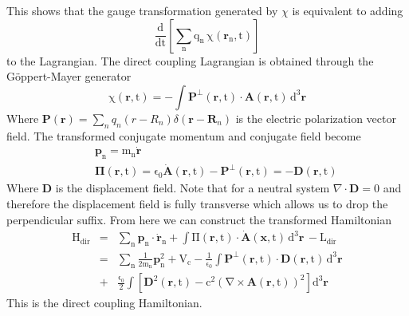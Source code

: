 \documentclass[twocolumn,english,pra,aps,superscriptaddress,floatfix]{revtex4-1}
\begin{document}
This shows that the gauge transformation generated by $\chi$ is equivalent to adding 
\begin{equation}
\mathrm{\frac{d}{dt}\left[\sum_n q_n\,\chi(\mathbf{r}_n,t)\right]}
\end{equation}
to the Lagrangian.  The direct coupling Lagrangian is obtained through the G\"{o}ppert-Mayer generator
\begin{equation}
\mathrm{\chi(\mathbf{r},t)=-\int \mathbf{P}^{\perp}(\mathbf{r},t)\cdot\mathbf{A}(\mathbf{r},t)\,d^3\mathbf{r}}
\end{equation}
Where $\mathbf{P}(\mathbf{r})=\sum_n q_n\left(r-R_n\right)\delta(\mathbf{r}-\mathbf{R}_n)$ is the electric polarization vector field.  The transformed conjugate momentum and conjugate field become
\begin{eqnarray}
&&\mathrm{\mathbf{p}_n=m_n\dot{\mathbf{r}}} \\
&&\mathrm{\mathbf{\Pi}(\mathbf{r},t)=\epsilon_0 \dot{\mathbf{A}}(\mathbf{r},t)-\mathbf{P}^{\perp}(\mathbf{r},t)=-\mathbf{D}(\mathbf{r},t)}
\end{eqnarray}
Where $\mathbf{D}$ is the displacement field.  Note that for a neutral system $\nabla\cdot\mathbf{D}=0$ and therefore the displacement field is fully transverse which allows us to drop the perpendicular suffix. From here we can construct the transformed Hamiltonian 
\begin{eqnarray}
\mathrm{H_{dir}}&=&\mathrm{\sum_n\mathbf{p}_n\cdot\dot{\mathbf{r}}_n+\int\Pi(\mathbf{r},t)\cdot\dot{\mathbf{A}}(\mathbf{x},t)\,d^3\mathbf{r}\,-L_{dir}} \nonumber \\
&=&\mathrm{\sum_n \frac{1}{2m_n}\mathbf{p}^2_n+V_{c}-\frac{1}{\epsilon_0}\int \mathbf{P}^{\perp}(\mathbf{r},t)\cdot\mathbf{D}(\mathbf{r},t)\,d^3\mathbf{r}}\nonumber \\
&+&\mathrm{\frac{\epsilon_0}{2}\int\left[\mathbf{D}^2(\mathbf{r},t)-c^2\left(\nabla\times\mathbf{A}(\mathbf{r},t)\right)^2\right]d^3\mathbf{r}}
\label{minimalhamiltonian1}
\end{eqnarray} 
This is the direct coupling Hamiltonian. 

\end{document}
